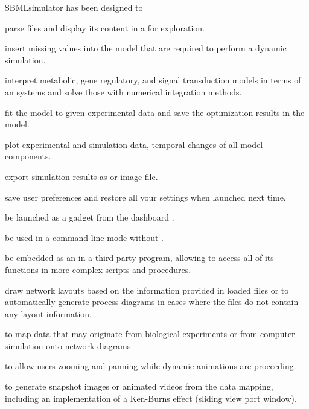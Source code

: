 SBMLsimulator has been designed to
\begin{dinglist}{52}
\item parse \SBML files and display its content in a \GUI for exploration.
\item insert missing values into the model that are required to perform a dynamic simulation.
\item interpret metabolic, gene regulatory, and signal
transduction models in terms of an \ODE systems and solve those with numerical integration methods.
\item fit the model to given experimental data and save the optimization results in the model.
\item plot experimental and simulation data, \ie temporal changes of all model components.
\item export simulation results as \CSV or image file.
\item save user preferences and restore all your settings when launched next time.
\item be launched as a \Garuda gadget from the \Garuda dashboard \citep{Ghosh2011}.
\item be used in a command-line mode without \GUI.
\item be embedded as an \API in a third-party program, allowing to access all of its functions in more complex scripts and procedures.
\item draw network layouts based on the information provided in loaded \SBML files or to automatically generate \SBGN process diagrams in cases where the \SBML files do not contain any layout information.
\item to map data that may originate from biological experiments or from computer simulation onto \SBGN network diagrams
\item to allow users zooming and panning while dynamic animations are proceeding.
\item to generate snapshot images or animated videos from the data mapping, including an implementation of a Ken-Burns effect (sliding view port window).
\end{dinglist}


